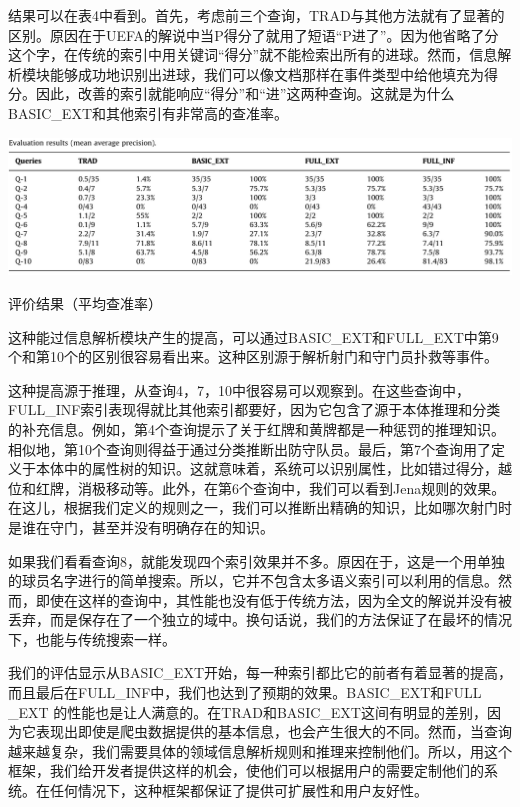 结果可以在表4中看到。首先，考虑前三个查询，{\Times TRAD}与其他方法就有了显著的区别。原因在于UEFA的解说中当{\Times P}得分了就用了短语“{\Times P}进了”。因为他省略了分这个字，在传统的索引中用关键词“得分”就不能检索出所有的进球。然而，信息解析模块能够成功地识别出进球，我们可以像文档那样在事件类型中给他填充为得分。因此，改善的索引就能响应“得分”和“进”这两种查询。这就是为什么{\Times BASIC\_EXT}和其他索引有非常高的查准率。
	\begin{table}[htbp] 
	\centering\includegraphics[width=6in]{fig/trans/tab4.png} 
	\caption[]{评价结果（平均查准率）}
	\end{table} 

这种能过信息解析模块产生的提高，可以通过{\Times BASIC\_EXT}和{\Times FULL\_EXT}中第9个和第10个的区别很容易看出来。这种区别源于解析射门和守门员扑救等事件。

这种提高源于推理，从查询4，7，10中很容易可以观察到。在这些查询中，{\Times FULL\_INF}索引表现得就比其他索引都要好，因为它包含了源于本体推理和分类的补充信息。例如，第4个查询提示了关于红牌和黄牌都是一种惩罚的推理知识。相似地，第10个查询则得益于通过分类推断出防守队员。最后，第7个查询用了定义于本体中的属性树的知识。这就意味着，系统可以识别属性，比如错过得分，越位和红牌，消极移动等。此外，在第6个查询中，我们可以看到{\Times Jena}规则的效果。在这儿，根据我们定义的规则之一，我们可以推断出精确的知识，比如哪次射门时是谁在守门，甚至并没有明确存在的知识。

如果我们看看查询8，就能发现四个索引效果并不多。原因在于，这是一个用单独的球员名字进行的简单搜索。所以，它并不包含太多语义索引可以利用的信息。然而，即使在这样的查询中，其性能也没有低于传统方法，因为全文的解说并没有被丢弃，而是保存在了一个独立的域中。换句话说，我们的方法保证了在最坏的情况下，也能与传统搜索一样。

我们的评估显示从{\Times BASIC\_EXT}开始，每一种索引都比它的前者有着显著的提高，而且最后在{\Times FULL\_INF}中，我们也达到了预期的效果。{\Times BASIC\_EXT}和{\Times FULL} {\Times \_EXT} 的性能也是让人满意的。在{\Times TRAD}和{\Times BASIC\_EXT}这间有明显的差别，因为它表现出即使是爬虫数据提供的基本信息，也会产生很大的不同。然而，当查询越来越复杂，我们需要具体的领域信息解析规则和推理来控制他们。所以，用这个框架，我们给开发者提供这样的机会，使他们可以根据用户的需要定制他们的系统。在任何情况下，这种框架都保证了提供可扩展性和用户友好性。

